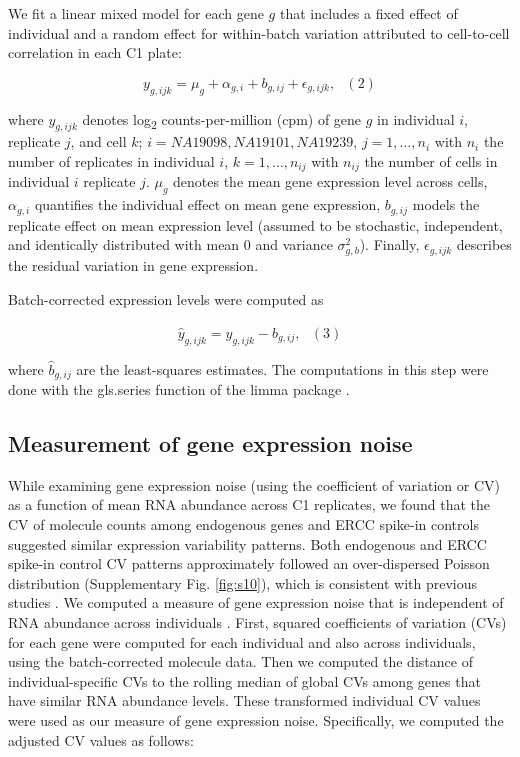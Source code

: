 We fit a linear mixed model for each gene $g$ that includes a fixed
effect of individual and a random effect for within-batch variation
attributed to cell-to-cell correlation in each C1 plate:

\[ y_{g,ijk} = \mu_{g} + \alpha_{g,i} + b_{g,ij} + \epsilon_{g,ijk}, \,\,\,\,(2)\]

where $y_{g,ijk}$ denotes log\textsubscript{2} counts-per-million (cpm)
of gene $g$ in individual $i$, replicate $j$, and cell $k$;
$i = NA19098, NA19101, NA19239$, $j = 1, \dots, n_i$ with $n_i$ the
number of replicates in individual $i$, $k = 1, \dots, n_{ij}$ with
$n_{ij}$ the number of cells in individual $i$ replicate $j$. $\mu_g$
denotes the mean gene expression level across cells, $\alpha_{g,i}$
quantifies the individual effect on mean gene expression, $b_{g,ij}$
models the replicate effect on mean expression level (assumed to be
stochastic, independent, and identically distributed with mean 0 and
variance $\sigma^2_{g,b}$). Finally, $\epsilon_{g,ijk}$ describes the
residual variation in gene expression.

Batch-corrected expression levels were computed as

\[ \widehat{y}_{g,ijk} = y_{g,ijk} - \widehat{b}_{g,ij}, \,\,\,\,(3)\]

where $\widehat{b}_{g,ij}$ are the least-squares estimates. The
computations in this step were done with the gls.series function of the
limma package \citep{limma}.

\subsection{Measurement of gene expression
noise}\label{measurement-of-gene-expression-noise}

While examining gene expression noise (using the coefficient of
variation or CV) as a function of mean RNA abundance across C1
replicates, we found that the CV of molecule counts among endogenous
genes and ERCC spike-in controls suggested similar expression
variability patterns. Both endogenous and ERCC spike-in control CV
patterns approximately followed an over-dispersed Poisson distribution
(Supplementary Fig. \ref{fig:s10}), which is consistent with previous studies
\citep{Islam2014, Brennecke2013}. We computed a measure of gene
expression noise that is independent of RNA abundance across individuals
\citep{Kolodziejczyk2015, Newman2006}. First, squared coefficients of
variation (CVs) for each gene were computed for each individual and also
across individuals, using the batch-corrected molecule data. Then we
computed the distance of individual-specific CVs to the rolling median
of global CVs among genes that have similar RNA abundance levels. These
transformed individual CV values were used as our measure of gene
expression noise. Specifically, we computed the adjusted CV values as
follows:

